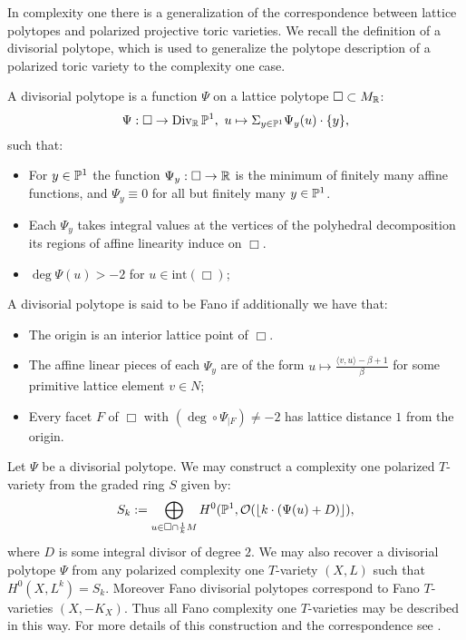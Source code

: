 In complexity one there is a generalization of the correspondence between lattice polytopes and polarized projective toric varieties. We recall the definition of a divisorial polytope, which is used to generalize the polytope description of a polarized toric variety to the complexity one case.
\begin{definition}
A divisorial polytope is a function \(\Psi\) on a lattice polytope \(\Box \subset M_{\mathbb{R}}\):
\[
\Psi: \Box \to \operatorname{Div}_{\mathbb{R}} \mathbb{P}^1, \ u \mapsto \Sigma_{y \in \mathbb{P}^1} \Psi_y(u) \cdot \{y\},
\]
such that:
\begin{itemize}
\item For \(y \in \mathbb{P}^1\) the function \(\Psi_y: \Box \to \mathbb{R}\) is the minimum of finitely many  affine functions, and \(\Psi_y \equiv 0\) for all but finitely many \(y \in \mathbb{P}^1\).
\item Each \(\Psi_y\) takes integral values at the vertices of the polyhedral decomposition its regions of affine linearity induce on \(\Box\).
\item \(\deg \Psi(u) > -2\) for \(u \in \text{int} (\Box)\);
\end{itemize}
A divisorial polytope is said to be Fano if additionally we have that:
\begin{itemize}
\item The origin is an interior lattice point of \(\Box\).
\item The affine linear pieces of each  \(\Psi_y\) are of the form \(u \mapsto \frac{\langle v,u \rangle - \beta + 1}{\beta}\) for some primitive lattice element \(v \in N\);
\item Every facet \(F\) of \(\Box\) with \((\deg \circ \Psi _{|F}) \neq -2\) has lattice distance \(1\) from the origin.
\end{itemize}
\end{definition}
Let \(\Psi\) be a divisorial polytope. We may construct a complexity one polarized \(T\)-variety from the graded ring \(S\) given by: 
\[
S_k := \bigoplus_{u \in \Box \cap \frac{1}{k} M} H^0(\mathbb{P}^1, \mathcal{O}(\lfloor k \cdot ( \Psi(u) +D) \rfloor),
\]
where \(D\) is some integral divisor of degree \(2\). We may also recover a divisorial polytope \(\Psi\) from any polarized complexity one \(T\)-variety \((X,L)\) such that \( H^0(X,L^k) = S_k\). Moreover Fano divisorial polytopes correspond to Fano \(T\)-varieties \((X,-K_X)\). Thus all Fano complexity one \(T\)-varieties may be described in this way. For more details of this construction and the correspondence see \cite{suss2013fano}.

